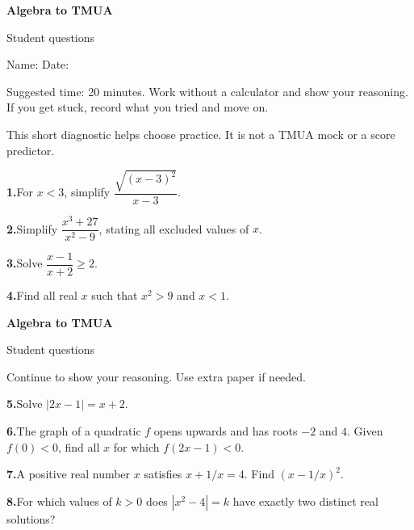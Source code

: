 \documentclass[11pt,a4paper]{article}
\begin{document}
{\LARGE\bfseries Algebra to TMUA}\par
{\large Student questions}\par
Name: \hrulefill\qquad Date: \hrulefill\par
Suggested time: 20 minutes. Work without a calculator and show your reasoning. If you get stuck, record what you tried and move on.\par
{\small This short diagnostic helps choose practice. It is not a TMUA mock or a score predictor.}\par
\vspace{4pt}\textbf{1.}\quad For \(x<3\), simplify \(\dfrac{\sqrt{(x-3)^2}}{x-3}\).\par\vfill
\vspace{4pt}\textbf{2.}\quad Simplify \(\dfrac{x^3+27}{x^2-9}\), stating all excluded values of \(x\).\par\vfill
\vspace{4pt}\textbf{3.}\quad Solve \(\dfrac{x-1}{x+2}\geq2\).\par\vfill
\vspace{4pt}\textbf{4.}\quad Find all real \(x\) such that \(x^2>9\) and \(x<1\).\par\vfill
\vspace{8mm}
\newpage
{\LARGE\bfseries Algebra to TMUA}\par
{\large Student questions}\par
{\small Continue to show your reasoning. Use extra paper if needed.}\par
\vspace{4pt}\textbf{5.}\quad Solve \(|2x-1|=x+2\).\par\vfill
\vspace{4pt}\textbf{6.}\quad The graph of a quadratic \(f\) opens upwards and has roots \(-2\) and \(4\). Given \(f(0)<0\), find all \(x\) for which \(f(2x-1)<0\).\par\vfill
\vspace{4pt}\textbf{7.}\quad A positive real number \(x\) satisfies \(x+1/x=4\). Find \((x-1/x)^2\).\par\vfill
\vspace{4pt}\textbf{8.}\quad For which values of \(k>0\) does \(|x^2-4|=k\) have exactly two distinct real solutions?\par\vfill
\vspace{8mm}
\end{document}
